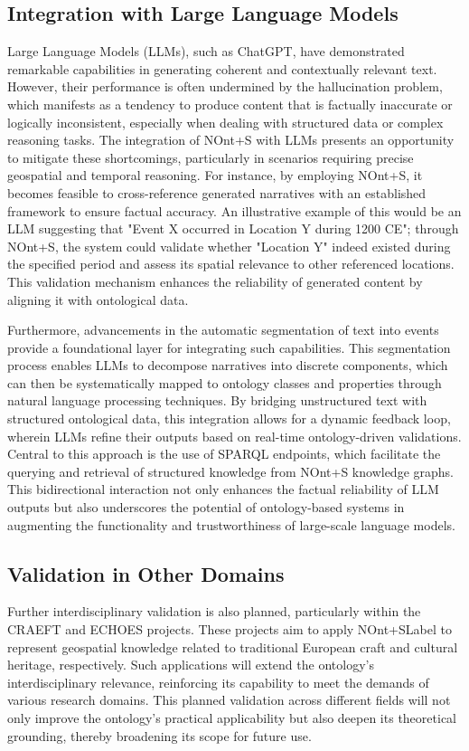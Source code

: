\subsection{Integration with Large Language Models}

Large Language Models (LLMs), such as ChatGPT\cite{ChatGPT}, have demonstrated remarkable capabilities in generating coherent and contextually relevant text. However, their performance is often undermined by the hallucination problem, which manifests as a tendency to produce content that is factually inaccurate or logically inconsistent, especially when dealing with structured data or complex reasoning tasks. The integration of NOnt+S with LLMs presents an opportunity to mitigate these shortcomings, particularly in scenarios requiring precise geospatial and temporal reasoning. For instance, by employing NOnt+S, it becomes feasible to cross-reference generated narratives with an established framework to ensure factual accuracy. An illustrative example of this would be an LLM suggesting that "Event X occurred in Location Y during 1200 CE"; through NOnt+S, the system could validate whether "Location Y" indeed existed during the specified period and assess its spatial relevance to other referenced locations. This validation mechanism enhances the reliability of generated content by aligning it with ontological data.

Furthermore, advancements in the automatic segmentation of text into events\cite{bartalesiUsingLargeLanguage2024} provide a foundational layer for integrating such capabilities. This segmentation process enables LLMs to decompose narratives into discrete components, which can then be systematically mapped to ontology classes and properties through natural language processing techniques. By bridging unstructured text with structured ontological data, this integration allows for a dynamic feedback loop, wherein LLMs refine their outputs based on real-time ontology-driven validations. Central to this approach is the use of SPARQL endpoints, which facilitate the querying and retrieval of structured knowledge from NOnt+S knowledge graphs. This bidirectional interaction not only enhances the factual reliability of LLM outputs but also underscores the potential of ontology-based systems in augmenting the functionality and trustworthiness of large-scale language models.


\subsection{Validation in Other Domains}
Further interdisciplinary validation is also planned, particularly within the CRAEFT \cite{CraeftCareJudgment} and ECHOES \cite{EchoesEccchEuropean} projects. These projects aim to apply \acrshort{NOnt+SLabel} to represent geospatial knowledge related to traditional European craft and cultural heritage, respectively. Such applications will extend the ontology’s interdisciplinary relevance, reinforcing its capability to meet the demands of various research domains. This planned validation across different fields will not only improve the ontology’s practical applicability but also deepen its theoretical grounding, thereby broadening its scope for future use.



